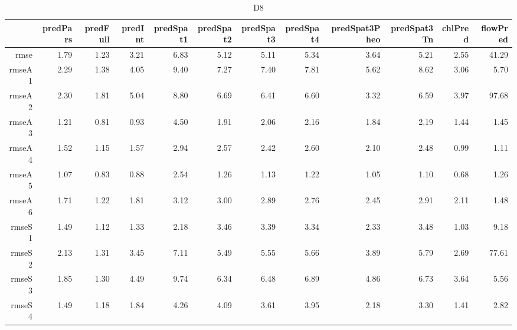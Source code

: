 \begin{table}[H]
\centering
\begingroup\fontsize{2.5pt}{4pt}\selectfont
\begin{tabular}{rrrrrrrrrrrr}
  \hline
 & predPars & predFull & predInt & predSpat1 & predSpat2 & predSpat3 & predSpat4 & predSpat3Pheo & predSpat3Tn & chlPred & flowPred \\ 
  \hline
rmse & 1.79 & 1.23 & 3.21 & 6.83 & 5.12 & 5.11 & 5.34 & 3.64 & 5.21 & 2.55 & 41.29 \\ 
  rmseA1 & 2.29 & 1.38 & 4.05 & 9.40 & 7.27 & 7.40 & 7.81 & 5.62 & 8.62 & 3.06 & 5.70 \\ 
  rmseA2 & 2.30 & 1.81 & 5.04 & 8.80 & 6.69 & 6.41 & 6.60 & 3.32 & 6.59 & 3.97 & 97.68 \\ 
  rmseA3 & 1.21 & 0.81 & 0.93 & 4.50 & 1.91 & 2.06 & 2.16 & 1.84 & 2.19 & 1.44 & 1.45 \\ 
  rmseA4 & 1.52 & 1.15 & 1.57 & 2.94 & 2.57 & 2.42 & 2.60 & 2.10 & 2.48 & 0.99 & 1.11 \\ 
  rmseA5 & 1.07 & 0.83 & 0.88 & 2.54 & 1.26 & 1.13 & 1.22 & 1.05 & 1.10 & 0.68 & 1.26 \\ 
  rmseA6 & 1.71 & 1.22 & 1.81 & 3.12 & 3.00 & 2.89 & 2.76 & 2.45 & 2.91 & 2.11 & 1.48 \\ 
  rmseS1 & 1.49 & 1.12 & 1.33 & 2.18 & 3.46 & 3.39 & 3.34 & 2.33 & 3.48 & 1.03 & 9.18 \\ 
  rmseS2 & 2.13 & 1.31 & 3.45 & 7.11 & 5.49 & 5.55 & 5.66 & 3.89 & 5.79 & 2.69 & 77.61 \\ 
  rmseS3 & 1.85 & 1.30 & 4.49 & 9.74 & 6.34 & 6.48 & 6.89 & 4.86 & 6.73 & 3.64 & 5.56 \\ 
  rmseS4 & 1.49 & 1.18 & 1.84 & 4.26 & 4.09 & 3.61 & 3.95 & 2.18 & 3.30 & 1.41 & 2.82 \\ 
   \hline
\end{tabular}
\endgroup
\caption{D8} 
\end{table}
